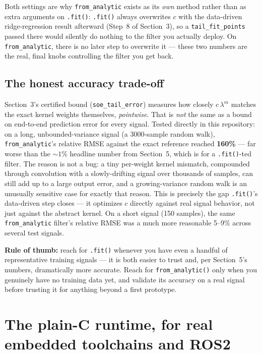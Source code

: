 \documentclass[11pt]{article}
\begin{document}
Both settings are why \texttt{from\_analytic} exists as its \emph{own} method rather than as extra arguments on \texttt{.fit()}: \texttt{.fit()} always overwrites $c$ with the data-driven ridge-regression result afterward (Step~8 of Section~3), so a \texttt{tail\_fit\_points} passed there would silently do nothing to the filter you actually deploy. On \texttt{from\_analytic}, there is no later step to overwrite it --- these two numbers are the real, final knobs controlling the filter you get back.

\subsection{The honest accuracy trade-off}
Section~3's certified bound (\texttt{soe\_tail\_error}) measures how closely $c\,\lambda^m$ matches the exact kernel weights themselves, \emph{pointwise}. That is \emph{not} the same as a bound on end-to-end prediction error for every signal. Tested directly in this repository: on a long, unbounded-variance signal (a 3000-sample random walk), \texttt{from\_analytic}'s relative RMSE against the exact reference reached \textbf{160\%} --- far worse than the $\sim\!1\%$ headline number from Section~5, which is for a \texttt{.fit()}-ted filter. The reason is not a bug: a tiny per-weight kernel mismatch, compounded through convolution with a slowly-drifting signal over thousands of samples, can still add up to a large output error, and a growing-variance random walk is an unusually sensitive case for exactly that reason. This is precisely the gap \texttt{.fit()}'s data-driven step closes --- it optimizes $c$ directly against real signal behavior, not just against the abstract kernel. On a short signal (150 samples), the same \texttt{from\_analytic} filter's relative RMSE was a much more reasonable 5--9\% across several test signals.

\begin{recap}
\textbf{Rule of thumb:} reach for \texttt{.fit()} whenever you have even a handful of representative training signals --- it is both easier to trust and, per Section~5's numbers, dramatically more accurate. Reach for \texttt{from\_analytic()} only when you genuinely have no training data yet, and validate its accuracy on a real signal before trusting it for anything beyond a first prototype.
\end{recap}

\section{The plain-C runtime, for real embedded toolchains and ROS2}
\label{sec:c-runtime}
\end{document}
